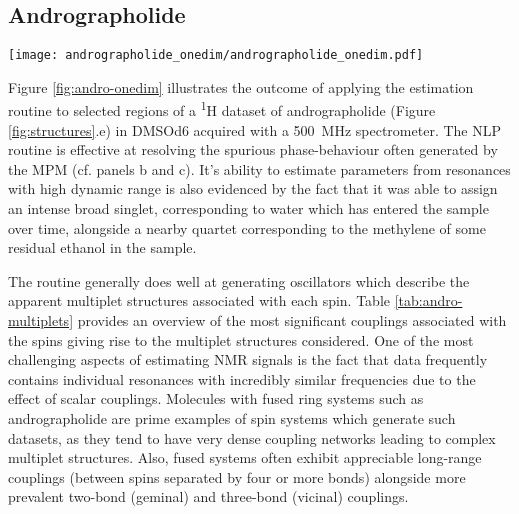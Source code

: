 \subsection{Andrographolide}
\begin{sidewaysfigure}
    \centering
    \texttt{[image: andrographolide\_onedim/andrographolide\_onedim.pdf]}
    \caption[
        Result of applying the estimation routine to selected regions of a
        pulse-acquire dataset of andrographolide.
    ]{
        Result of applying the estimation routine to selected regions of a
        pulse-acquire dataset of andrographolide in \acs{DMSOd6}.
        \textbf{a.} Spectral data corresponding to the regions considered.
        \textbf{b.} The result of applying the \acs{MPM} to the regions, with
        the model order predicted with the \acs{MDL}. Blue/red lines: peaks of
        individual oscillators, grey line above: the model (sum of all
        oscillators), grep line below: the residual between the data and the model.
        \textbf{c.} The result after convergence of the \acs{NLP} routine, again
        with the model above and residual below.
        Red peaks in panel b correspond to oscillators which acquire negative
        amplitudes during the \acs{NLP} routine, and are subsequently purged.
        Note that one of the reasons estimated has been split in two in the
        figure to save space, with one half, featuring a signal from ethanol,
        being magnified.
    }
    \label{fig:andro-onedim}
\end{sidewaysfigure}
Figure \ref{fig:andro-onedim} illustrates the outcome of applying the
estimation routine to selected regions of a \textsuperscript{1}H dataset of
andrographolide (Figure \ref{fig:structures}.e) in \acs{DMSOd6} acquired with
a \qty{500}{\mega\hertz} spectrometer. The \ac{NLP}
routine is effective at resolving the spurious phase-behaviour often generated
by the \ac{MPM} (cf. panels b and c).
It's ability to estimate parameters from resonances with high
dynamic range is also evidenced by the fact that it was able to assign an
intense broad singlet, corresponding to water which has entered the sample
over time, alongside a nearby quartet corresponding to the methylene of some
residual ethanol in the sample.

The routine generally does well at generating oscillators which describe the
apparent multiplet structures associated with each spin. Table
\ref{tab:andro-multiplets} provides an overview of the most significant
couplings associated with the spins giving rise to the multiplet structures
considered.
One of the most challenging aspects of estimating \ac{NMR} signals is
the fact that data frequently contains individual resonances with incredibly
similar frequencies due to the effect of scalar couplings. Molecules
with fused ring systems such as andrographolide are prime examples of spin
systems which generate such datasets, as they tend to have very dense coupling
networks leading to complex multiplet structures. Also, fused systems often
exhibit appreciable long-range couplings (between spins separated by four or more bonds) alongside more prevalent two-bond (geminal) and three-bond (vicinal) couplings.

